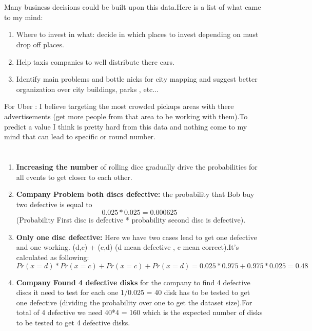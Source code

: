 \documentclass{article}
\begin{document}
	\section*{}
	Many business decisions could be built upon this data.Here is a list of what came to my mind:\\
	\begin{enumerate}
		\item Where to invest in what: decide in which places to invest depending on must drop off places.
		\item Help taxis companies to well distribute there cars.
		\item Identify main problems and bottle nicks for city mapping and suggest better organization over city buildings, parks , etc...
	\end{enumerate}
For Uber : I believe targeting the most crowded pickups areas with there advertisements (get more people from that area to be working with them).To predict a value I think is pretty hard from this data and nothing come to my mind that can lead to specific or round number.
	\section*{}
	\begin{enumerate}
			\item \textbf{Increasing the number } of rolling dice gradually drive the probabilities for all events to get closer to each other.
			\item \textbf{Company Problem both discs defective:} the probability that Bob buy two defective is equal to \[0.025*0.025=0.000625\](Probability First disc is defective * probability second disc is defective).
			\item \textbf{Only one disc defective: }Here we have two cases lead to get one defective and one working. (d,c) + (c,d) (d mean defective , c mean correct).It's calculated as following:\\
			\[Pr(x=d)*Pr(x=c)+Pr(x=c)+Pr(x=d)=0.025*0.975 + 0.975*0.025 = 0.48\] 
			\item \textbf{Company Found 4 defective disks} for the company to find 4 defective discs it need to test for each one 1/0.025 = 40 disk has to be tested to get one defective (dividing the probability over one to get the dataset size).For total of 4 defective we need 40*4 = 160 which is the expected number of disks to be tested to get 4 defective disks.
	\end{enumerate}
\end{document}
